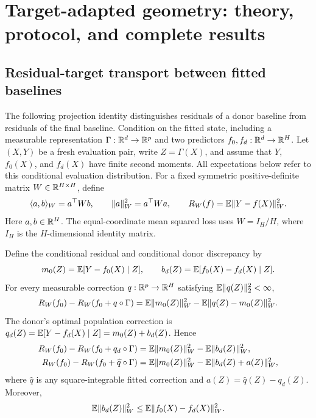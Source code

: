 \section{Target-adapted geometry: theory, protocol, and complete results}
\label{app:target-geometry}

\subsection{Residual-target transport between fitted baselines}
\label{app:target-transport}

The following projection identity distinguishes residuals of a donor
baseline from residuals of the final baseline. Condition on the fitted
state, including a measurable representation
$\Gamma:\mathbb{R}^d\to\mathbb{R}^p$ and two predictors
$f_0,f_d:\mathbb{R}^d\to\mathbb{R}^H$. Let $(X,Y)$ be a fresh evaluation pair,
write $Z=\Gamma(X)$, and assume that $Y$, $f_0(X)$, and $f_d(X)$
have finite second moments. All expectations below refer to this
conditional evaluation distribution. For a fixed symmetric
positive-definite matrix $W\in\mathbb{R}^{H\times H}$, define
\[
 \langle a,b\rangle_W=a^\top Wb,\qquad
 \|a\|_W^2=a^\top Wa,\qquad
 R_W(f)=\mathbb{E}\|Y-f(X)\|_W^2.
\]
Here $a,b\in\mathbb{R}^H$. The equal-coordinate mean squared loss uses
$W=I_H/H$, where $I_H$ is the $H$-dimensional identity matrix.

\begin{proposition}
\label{prop:target-transport}
Define the conditional residual and conditional donor discrepancy by
\[
 m_0(Z)=\mathbb{E}[Y-f_0(X)\mid Z],\qquad
 b_d(Z)=\mathbb{E}[f_0(X)-f_d(X)\mid Z].
\]
For every measurable correction $q:\mathbb{R}^p\to\mathbb{R}^H$ satisfying
$\mathbb{E}\|q(Z)\|_2^2<\infty$,
\begin{equation}
 R_W(f_0)-R_W(f_0+q\circ\Gamma)
 =\mathbb{E}\|m_0(Z)\|_W^2-\mathbb{E}\|q(Z)-m_0(Z)\|_W^2.
 \label{eq:target-general-gain}
\end{equation}
The donor's optimal population correction is
$q_d(Z)=\mathbb{E}[Y-f_d(X)\mid Z]=m_0(Z)+b_d(Z)$. Hence
\begin{align}
 R_W(f_0)-R_W(f_0+q_d\circ\Gamma)
 &=\mathbb{E}\|m_0(Z)\|_W^2-\mathbb{E}\|b_d(Z)\|_W^2,
 \label{eq:target-transport-proof}\\
 R_W(f_0)-R_W(f_0+\widehat q\circ\Gamma)
 &=\mathbb{E}\|m_0(Z)\|_W^2-\mathbb{E}\|b_d(Z)+a(Z)\|_W^2,
 \label{eq:target-fitted-transport}
\end{align}
where $\widehat q$ is any square-integrable fitted correction and
$a(Z)=\widehat q(Z)-q_d(Z)$. Moreover,
\[
 \mathbb{E}\|b_d(Z)\|_W^2\leq\mathbb{E}\|f_0(X)-f_d(X)\|_W^2.
\]
\end{proposition}

